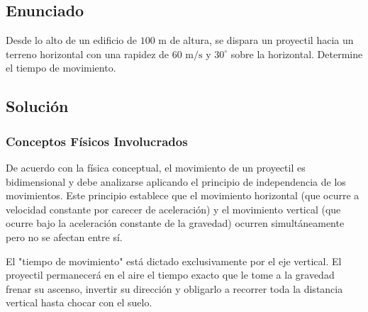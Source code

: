 \documentclass[12pt, a4paper]{article}
\begin{document}
\newpage

\subsection*{Enunciado}

Desde lo alto de un edificio de $100 \text{ m}$ de altura, se dispara un proyectil hacia un terreno horizontal con una rapidez de $60 \text{ m/s}$ y $30^\circ$ sobre la horizontal. Determine el tiempo de movimiento.

\vspace{0.5cm}

\begin{center}
\end{center}

\subsection*{Solución}

\subsubsection*{Conceptos Físicos Involucrados}

De acuerdo con la física conceptual, el movimiento de un proyectil es bidimensional y debe analizarse aplicando el principio de independencia de los movimientos. Este principio establece que el movimiento horizontal (que ocurre a velocidad constante por carecer de aceleración) y el movimiento vertical (que ocurre bajo la aceleración constante de la gravedad) ocurren simultáneamente pero no se afectan entre sí. 

El "tiempo de movimiento" está dictado exclusivamente por el eje vertical. El proyectil permanecerá en el aire el tiempo exacto que le tome a la gravedad frenar su ascenso, invertir su dirección y obligarlo a recorrer toda la distancia vertical hasta chocar con el suelo.
\end{document}
